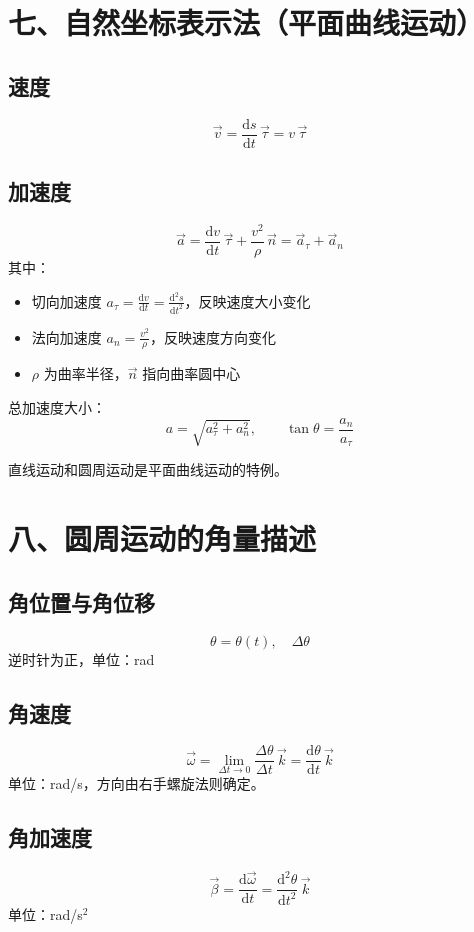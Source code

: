 \documentclass{ctexart}
\begin{document}
\section*{七、自然坐标表示法（平面曲线运动）}

\subsection*{速度}
\[
\vec{v} = \frac{\mathrm{d}s}{\mathrm{d}t}\,\vec{\tau} = v\,\vec{\tau}
\]

\subsection*{加速度}
\[
\vec{a} = \frac{\mathrm{d}v}{\mathrm{d}t}\,\vec{\tau} + \frac{v^{2}}{\rho}\,\vec{n}
= \vec{a}_{\tau} + \vec{a}_{n}
\]
其中：
\begin{itemize}
  \item 切向加速度 $\displaystyle a_{\tau} = \frac{\mathrm{d}v}{\mathrm{d}t} = \frac{\mathrm{d}^{2}s}{\mathrm{d}t^{2}}$，反映速度大小变化
  \item 法向加速度 $\displaystyle a_{n} = \frac{v^{2}}{\rho}$，反映速度方向变化
  \item $\rho$ 为曲率半径，$\vec{n}$ 指向曲率圆中心
\end{itemize}

总加速度大小：
\[
a = \sqrt{a_{\tau}^{2} + a_{n}^{2}},\qquad
\tan\theta = \frac{a_{n}}{a_{\tau}}
\]

直线运动和圆周运动是平面曲线运动的特例。

\section*{八、圆周运动的角量描述}

\subsection*{角位置与角位移}
\[
\theta = \theta(t),\quad \Delta\theta
\]
逆时针为正，单位：rad

\subsection*{角速度}
\[
\vec{\omega} = \lim_{\Delta t\to 0}\frac{\Delta\theta}{\Delta t}\,\vec{k} = \frac{\mathrm{d}\theta}{\mathrm{d}t}\,\vec{k}
\]
单位：rad/s，方向由右手螺旋法则确定。

\subsection*{角加速度}
\[
\vec{\beta} = \frac{\mathrm{d}\vec{\omega}}{\mathrm{d}t} = \frac{\mathrm{d}^{2}\theta}{\mathrm{d}t^{2}}\,\vec{k}
\]
单位：rad/s$^{2}$
\end{document}
